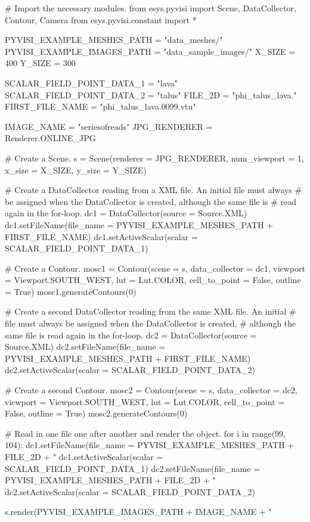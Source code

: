 \begin{python}
# Import the necessary modules.
from esys.pyvisi import Scene, DataCollector, Contour, Camera 
from esys.pyvisi.constant import *

PYVISI_EXAMPLE_MESHES_PATH = "data_meshes/"
PYVISI_EXAMPLE_IMAGES_PATH = "data_sample_images/"
X_SIZE = 400
Y_SIZE = 300

SCALAR_FIELD_POINT_DATA_1 = "lava"
SCALAR_FIELD_POINT_DATA_2 = "talus"
FILE_2D = "phi_talus_lava."
FIRST_FILE_NAME = "phi_talus_lava.0099.vtu"

IMAGE_NAME = "seriesofreads"
JPG_RENDERER = Renderer.ONLINE_JPG


# Create a Scene.
s = Scene(renderer = JPG_RENDERER, num_viewport = 1, x_size = X_SIZE, 
        y_size = Y_SIZE)

# Create a DataCollector reading from a XML file. An initial file must always
# be assigned when the DataCollector is created, although the same file is 
# read again in the for-loop.   
dc1 = DataCollector(source = Source.XML)
dc1.setFileName(file_name = PYVISI_EXAMPLE_MESHES_PATH + FIRST_FILE_NAME)
dc1.setActiveScalar(scalar = SCALAR_FIELD_POINT_DATA_1)

# Create a Contour.
mosc1 = Contour(scene = s, data_collector = dc1, 
        viewport = Viewport.SOUTH_WEST, lut = Lut.COLOR, cell_to_point = False,
        outline = True)
mosc1.generateContours(0)

# Create a second DataCollector reading from the same XML file. An initial 
# file must always be assigned when the DataCollector is created, 
# although the same file is read again in the for-loop.   
dc2 = DataCollector(source = Source.XML)
dc2.setFileName(file_name = PYVISI_EXAMPLE_MESHES_PATH + FIRST_FILE_NAME)
dc2.setActiveScalar(scalar = SCALAR_FIELD_POINT_DATA_2)

# Create a second Contour.
mosc2 = Contour(scene = s, data_collector = dc2, 
        viewport = Viewport.SOUTH_WEST, lut = Lut.COLOR, cell_to_point = False,
        outline = True)
mosc2.generateContours(0)

# Read in one file one after another and render the object. 
for i in range(99, 104):
    dc1.setFileName(file_name =  PYVISI_EXAMPLE_MESHES_PATH + FILE_2D +
	        "%
    dc1.setActiveScalar(scalar = SCALAR_FIELD_POINT_DATA_1)
    dc2.setFileName(file_name =  PYVISI_EXAMPLE_MESHES_PATH + FILE_2D +
	        "%
    dc2.setActiveScalar(scalar = SCALAR_FIELD_POINT_DATA_2)

    s.render(PYVISI_EXAMPLE_IMAGES_PATH + IMAGE_NAME + "%
\end{python}

